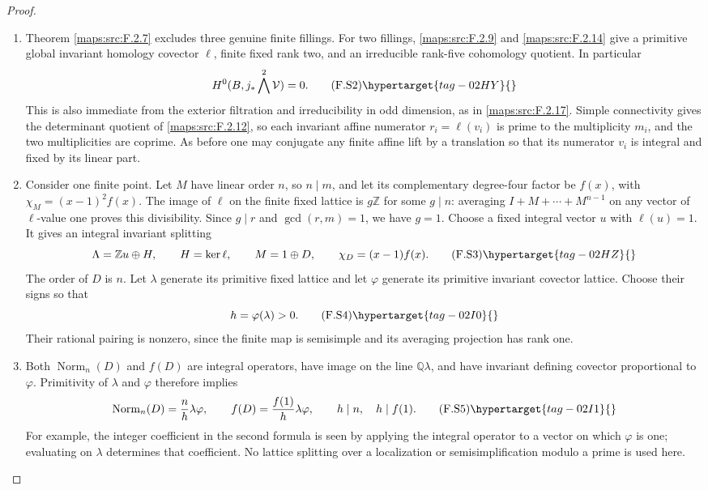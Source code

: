 \begin{proof}
\begin{enumerate}[label={$\langle1\rangle$\arabic*.}]
\item Theorem \ref{maps:src:F.2.7} excludes three genuine finite fillings.
For two fillings, \ref{maps:src:F.2.9} and \ref{maps:src:F.2.14} give a primitive global
invariant homology covector $\ell$, finite fixed rank two,
and an irreducible rank-five cohomology quotient.
In particular
\[
 H^0(B,j_*\bigwedge^2\mathcal V)=0.
 \tag{F.S2}\hypertarget{tag-02HY}{}\label{maps:eq:F.S2}
\]
This is also immediate from the exterior filtration and
irreducibility in odd dimension, as in \ref{maps:src:F.2.17}.
Simple connectivity gives the determinant quotient of
\ref{maps:src:F.2.12}, so each invariant affine numerator $r_i=\ell(v_i)$
is prime to the multiplicity $m_i$, and the two
multiplicities are coprime.
As before one may conjugate any finite affine lift by a
translation so that its numerator $v_i$ is integral and
fixed by its linear part.

\item Consider one finite point.  Let $M$ have linear order $n$,
so $n\mid m$, and let its complementary degree-four factor
be $f(x)$, with
$\chi_M=(x-1)^2f(x)$.
The image of $\ell$ on the finite fixed lattice is $g\mathbb Z$
for some $g\mid n$: averaging $I+M+\cdots+M^{n-1}$ on
any vector of $\ell$-value one proves this divisibility.
Since $g\mid r$ and $\gcd(r,m)=1$, we have $g=1$.
Choose a fixed integral vector $u$ with $\ell(u)=1$.
It gives an integral invariant splitting
\[
 \Lambda=\mathbb Zu\oplus H,
 \qquad H=\ker\ell,\qquad M=1\oplus D,
 \qquad\chi_D=(x-1)f(x).
 \tag{F.S3}\hypertarget{tag-02HZ}{}\label{maps:eq:F.S3}
\]
The order of $D$ is $n$.
Let $\lambda$ generate its primitive fixed lattice and
let $\varphi$ generate its primitive invariant covector
lattice.  Choose their signs so that
\[
 h=\varphi(\lambda)>0.
 \tag{F.S4}\hypertarget{tag-02I0}{}\label{maps:eq:F.S4}
\]
Their rational pairing is nonzero, since the finite map
is semisimple and its averaging projection has rank one.

\item Both $\operatorname{Norm}_n(D)$ and $f(D)$ are integral
operators, have image on the line $\mathbb Q\lambda$,
and have invariant defining covector proportional to
$\varphi$.  Primitivity of $\lambda$ and $\varphi$
therefore implies
\[
 \operatorname{Norm}_n(D)=\frac n h\lambda\varphi,
 \qquad
 f(D)=\frac{f(1)}h\lambda\varphi,
 \qquad h\mid n,\quad h\mid f(1).
 \tag{F.S5}\hypertarget{tag-02I1}{}\label{maps:eq:F.S5}
\]
For example, the integer coefficient in the second formula
is seen by applying the integral operator to a vector on
which $\varphi$ is one; evaluating on $\lambda$ determines
that coefficient.  No lattice splitting over a localization
or semisimplification modulo a prime is used here.


\end{enumerate}
\end{proof}
